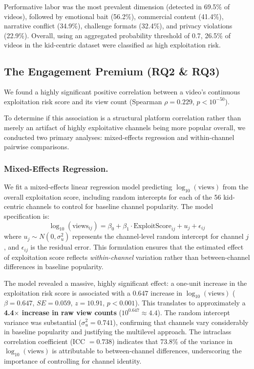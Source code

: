 \documentclass[]{ieeeaccess}
\begin{document}
Performative labor was the most prevalent dimension (detected in 69.5\% of videos), followed by emotional bait (56.2\%), commercial content (41.4\%), narrative conflict (34.9\%), challenge formats (32.4\%), and privacy violations (22.9\%). Overall, using an aggregated probability threshold of 0.7, 26.5\% of videos in the kid-centric dataset were classified as high exploitation risk.


\subsection{The Engagement Premium (RQ2 \& RQ3)}

We found a highly significant positive correlation between a video's continuous exploitation risk score and its view count (Spearman $\rho = 0.229$, $p < 10^{-50}$).

To determine if this association is a structural platform correlation rather than merely an artifact of highly exploitative channels being more popular overall, we conducted two primary analyses: mixed-effects regression and within-channel pairwise comparisons.

\subsubsection{Mixed-Effects Regression.}

We fit a mixed-effects linear regression model predicting $\log_{10}(\text{views})$ from the overall exploitation score, including random intercepts for each of the 56 kid-centric channels to control for baseline channel popularity. The model specification is:
\[
\log_{10}(\text{views}_{ij}) = \beta_0 + \beta_1 \cdot \text{ExploitScore}_{ij} + u_j + \epsilon_{ij}
\]
where $u_j \sim N(0, \sigma^2_u)$ represents the channel-level random intercept for channel $j$, and $\epsilon_{ij}$ is the residual error. This formulation ensures that the estimated effect of exploitation score reflects \emph{within-channel} variation rather than between-channel differences in baseline popularity.

The model revealed a massive, highly significant effect: a one-unit increase in the exploitation risk score is associated with a $0.647$ increase in $\log_{10}(\text{views})$ ($\beta = 0.647$, $SE = 0.059$, $z = 10.91$, $p < 0.001$). This translates to approximately a \textbf{4.4$\times$ increase in raw view counts} ($10^{0.647} \approx 4.4$). The random intercept variance was substantial ($\sigma^2_u = 0.741$), confirming that channels vary considerably in baseline popularity and justifying the multilevel approach. The intraclass correlation coefficient (ICC $= 0.738$) indicates that 73.8\% of the variance in $\log_{10}(\text{views})$ is attributable to between-channel differences, underscoring the importance of controlling for channel identity.
\end{document}
